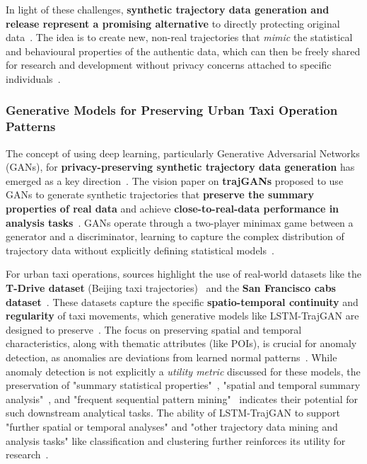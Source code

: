 \documentclass[runningheads]{llncs}
\begin{document}
In light of these challenges, \textbf{synthetic trajectory data generation and release represent a promising alternative} to directly protecting original data~\cite{Buchholz2024SoK,Rao2021LSTMTrajGAN,Liu2018TrajGANs}. The idea is to create new, non-real trajectories that \textit{mimic} the statistical and behavioural properties of the authentic data, which can then be freely shared for research and development without privacy concerns attached to specific individuals~\cite{Rao2021LSTMTrajGAN,Liu2018TrajGANs,Qu2020GANs5G}.

\subsubsection{Generative Models for Preserving Urban Taxi Operation Patterns}

The concept of using deep learning, particularly Generative Adversarial Networks (GANs), for \textbf{privacy-preserving synthetic trajectory data generation} has emerged as a key direction~\cite{Buchholz2024SoK,Liu2018TrajGANs,Rao2021LSTMTrajGAN,Qu2020GANs5G}. The vision paper on \textbf{trajGANs} proposed to use GANs to generate synthetic trajectories that \textbf{preserve the summary properties of real data} and achieve \textbf{close-to-real-data performance in analysis tasks}~\cite{Liu2018TrajGANs,Rao2021LSTMTrajGAN}. GANs operate through a two-player minimax game between a generator and a discriminator, learning to capture the complex distribution of trajectory data without explicitly defining statistical models~\cite{Rao2021LSTMTrajGAN,Qu2020GANs5G,Buchholz2024SoK,Ponomareva2023HowToDPfyML}.

For urban taxi operations, sources highlight the use of real-world datasets like the \textbf{T-Drive dataset} (Beijing taxi trajectories)~\cite{Ma2021TrajectoryPrivacy,Primault2014DPLPP,Primault2019LongRoad} and the \textbf{San Francisco cabs dataset}~\cite{Primault2014DPLPP,Primault2019LongRoad}. These datasets capture the specific \textbf{spatio-temporal continuity} and \textbf{regularity} of taxi movements, which generative models like LSTM-TrajGAN are designed to preserve~\cite{Rao2021LSTMTrajGAN,Liu2018TrajGANs,Jin2023SurveyExpStudy}. The focus on preserving spatial and temporal characteristics, along with thematic attributes (like POIs), is crucial for anomaly detection, as anomalies are deviations from learned normal patterns~\cite{Rao2021LSTMTrajGAN,Naghizade2020PrivacyContextAware}. While anomaly detection is not explicitly a \textit{utility metric} discussed for these models, the preservation of "summary statistical properties"~\cite{Liu2018TrajGANs}, "spatial and temporal summary analysis"~\cite{Rao2021LSTMTrajGAN,Chen2011DPTP}, and "frequent sequential pattern mining"~\cite{Chen2011DPTP} indicates their potential for such downstream analytical tasks. The ability of LSTM-TrajGAN to support "further spatial or temporal analyses" and "other trajectory data mining and analysis tasks" like classification and clustering further reinforces its utility for research~\cite{Rao2021LSTMTrajGAN,Chen2011DPTP}.
\end{document}

